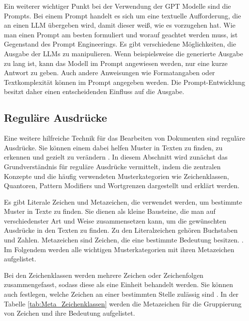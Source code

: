 Ein weiterer wichtiger Punkt bei der Verwendung der \ac{GPT} Modelle sind die Prompts. Bei einem Prompt handelt es sich um eine textuelle Aufforderung, die an einen \ac{LLM} übergeben wird, damit dieser weiß, wie es vorzugehen hat. Wie man einen Prompt am besten formuliert und worauf geachtet werden muss, ist Gegenstand des Prompt Engineerings. Es gibt verschiedene Möglichkeiten, die Ausgabe der \ac{LLM}s zu manipulieren. Wenn beispielsweise die generierte Ausgabe zu lang ist, kann das Modell im Prompt angewiesen werden, nur eine kurze Antwort zu geben. Auch andere Anweisungen wie Formatangaben oder Textkomplexität können im Prompt angegeben werden. Die Prompt-Entwicklung besitzt daher einen entscheidenden Einfluss auf die Ausgabe. \cite{openai_quickstart}

\subsection{Reguläre Ausdrücke}
Eine weitere hilfreiche Technik für das Bearbeiten von Dokumenten sind reguläre Ausdrücke. Sie können einem dabei helfen Muster in Texten zu finden, zu erkennen und gezielt zu verändern \cite[S.1]{friedl2009regulare}. In diesem Abschnitt wird zunächst das Grundverständnis für reguläre Ausdrücke vermittelt, indem die zentralen Konzepte und die häufig verwendeten Musterkategorien wie Zeichenklassen, Quantoren, Pattern Modifiers und Wortgrenzen dargestellt und erklärt werden.

Es gibt Literale Zeichen und Metazeichen, die verwendet werden, um bestimmte Muster in Texte zu finden. Sie dienen als kleine Bausteine, die man auf verschiedenster Art und Weise zusammensetzen kann, um die gewünschten Ausdrücke in den Texten zu finden. Zu den Literalzeichen gehören Buchstaben und Zahlen. Metazeichen sind Zeichen, die eine bestimmte Bedeutung besitzen. \cite[S.5]{friedl2009regulare}. Im Folgendem werden alle wichtigen Musterkategorien mit ihren Metazeichen aufgelistet.

Bei den Zeichenklassen werden mehrere Zeichen oder Zeichenfolgen zusammengefasst, sodass diese als eine Einheit behandelt werden. Sie können auch festlegen, welche Zeichen an einer bestimmten Stelle zulässig sind \cite[S.9]{friedl2009regulare}. In der Tabelle \ref{tab:Meta_Zeichenklassen} werden die Metazeichen für die Gruppierung von Zeichen und ihre Bedeutung aufgelistet.

